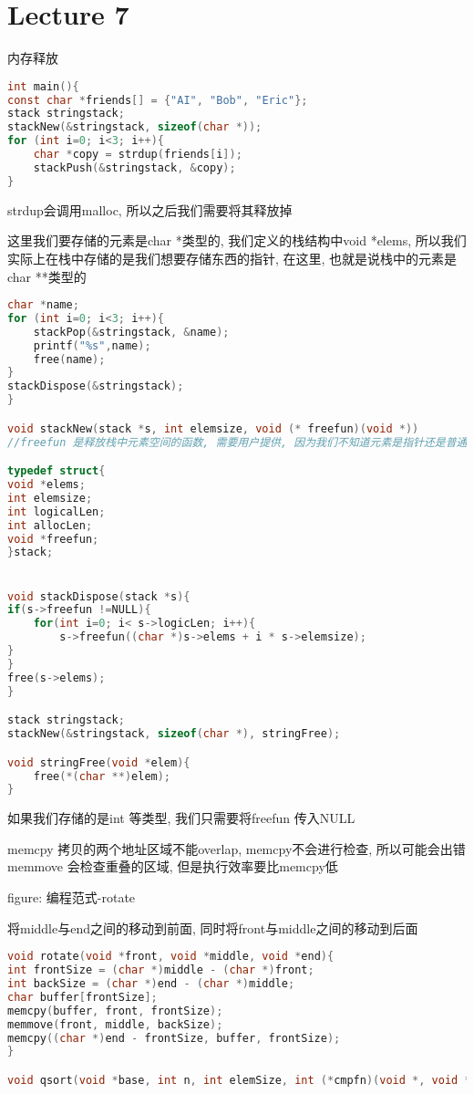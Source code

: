 \documentclass{article}
\begin{document}
\section{Lecture 7}
内存释放
\begin{lstlisting}[language = C]
int main(){
const char *friends[] = {"AI", "Bob", "Eric"};
stack stringstack;
stackNew(&stringstack, sizeof(char *));
for (int i=0; i<3; i++){
	char *copy = strdup(friends[i]);
	stackPush(&stringstack, &copy);
}
\end{lstlisting}
strdup会调用malloc, 所以之后我们需要将其释放掉

这里我们要存储的元素是char *类型的, 我们定义的栈结构中void *elems, 所以我们实际上在栈中存储的是我们想要存储东西的指针, 在这里, 也就是说栈中的元素是char **类型的

\begin{lstlisting}[language = C]
char *name;
for (int i=0; i<3; i++){
	stackPop(&stringstack, &name);
	printf("%s",name);
	free(name);
}
stackDispose(&stringstack);
}

void stackNew(stack *s, int elemsize, void (* freefun)(void *))
//freefun 是释放栈中元素空间的函数, 需要用户提供, 因为我们不知道元素是指针还是普通元素

typedef struct{
void *elems;
int elemsize;
int logicalLen;
int allocLen;
void *freefun;
}stack;


void stackDispose(stack *s){
if(s->freefun !=NULL){
	for(int i=0; i< s->logicLen; i++){
		s->freefun((char *)s->elems + i * s->elemsize);
}
}
free(s->elems);
}

stack stringstack;
stackNew(&stringstack, sizeof(char *), stringFree);

void stringFree(void *elem){
	free(*(char **)elem);
}
\end{lstlisting}
如果我们存储的是int 等类型, 我们只需要将freefun 传入NULL

memcpy 拷贝的两个地址区域不能overlap, memcpy不会进行检查, 所以可能会出错
memmove 会检查重叠的区域, 但是执行效率要比memcpy低

figure: 编程范式-rotate
 
将middle与end之间的移动到前面, 同时将front与middle之间的移动到后面
\begin{lstlisting}[language = C]
void rotate(void *front, void *middle, void *end){
int frontSize = (char *)middle - (char *)front;
int backSize = (char *)end - (char *)middle;
char buffer[frontSize];
memcpy(buffer, front, frontSize);
memmove(front, middle, backSize);
memcpy((char *)end - frontSize, buffer, frontSize);
}

void qsort(void *base, int n, int elemSize, int (*cmpfn)(void *, void *))
\end{lstlisting}
\end{document}
